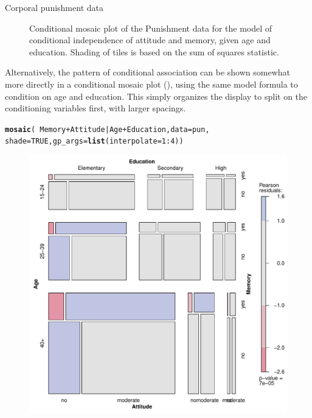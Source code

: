 \documentclass[11pt]{book}\usepackage[]{graphicx}\usepackage[]{color}
\makeatletter
\newcommand{\hlnum}[1]{\textcolor[rgb]{0.686,0.059,0.569}{#1}}%
\newcommand{\hlopt}[1]{\textcolor[rgb]{0,0,0}{#1}}%
\newcommand{\hlstd}[1]{\textcolor[rgb]{0.345,0.345,0.345}{#1}}%
\newcommand{\hlkwc}[1]{\textcolor[rgb]{0.333,0.667,0.333}{#1}}%
\newcommand{\hlkwd}[1]{\textcolor[rgb]{0.737,0.353,0.396}{\textbf{#1}}}%
\newenvironment{kframe}{%
 \def\at@end@of@kframe{}%
 \ifinner\ifhmode%
  \def\at@end@of@kframe{\end{minipage}}%
  \begin{minipage}{\columnwidth}%
 \fi\fi%
 \def\FrameCommand##1{\hskip\@totalleftmargin \hskip-\fboxsep
 \colorbox{shadecolor}{##1}\hskip-\fboxsep
     \hskip-\linewidth \hskip-\@totalleftmargin \hskip\columnwidth}%
 \MakeFramed {\advance\hsize-\width
   \@totalleftmargin\z@ \linewidth\hsize
   \@setminipage}}%
 {\par\unskip\endMakeFramed%
 \at@end@of@kframe}
\newenvironment{knitrout}{}{} %
\renewenvironment{knitrout}{\small\renewcommand{\baselinestretch}{.85}}{} %
\makeatother
\begin{document}
\begin{Example}[punish]{Corporal punishment data}
\begin{knitrout}
\begin{figure}[!htb]
\caption[Conditional mosaic plot of the Punishment data for the model of conditional independence of attitude and memory, given age and education]{Conditional mosaic plot of the Punishment data for the model of conditional independence of attitude and memory, given age and education. Shading of tiles is based on the sum of squares statistic.\label{fig:punish-cond1}}
\end{figure}


\end{knitrout}


Alternatively, the pattern of conditional association can be shown somewhat more directly
in a conditional mosaic plot (), using the same model formula to condition on
age and education. This simply organizes the display to split on the conditioning
variables first, with larger spacings.
\begin{knitrout}
\color{fgcolor}\begin{kframe}
\begin{alltt}
\hlkwd{mosaic}\hlstd{(}\hlopt{~} \hlstd{Memory} \hlopt{+} \hlstd{Attitude} \hlopt{|} \hlstd{Age} \hlopt{+} \hlstd{Education,} \hlkwc{data} \hlstd{= pun,}
       \hlkwc{shade}\hlstd{=}\hlnum{TRUE}\hlstd{,} \hlkwc{gp_args}\hlstd{=}\hlkwd{list}\hlstd{(}\hlkwc{interpolate}\hlstd{=}\hlnum{1}\hlopt{:}\hlnum{4}\hlstd{))}
\end{alltt}
\end{kframe}\begin{figure}[!htb]


\centerline{\includegraphics[width=.8\textwidth]{ch05/fig/punish-cond2} }


\end{figure}
\end{knitrout}
\end{Example}
\end{document}
